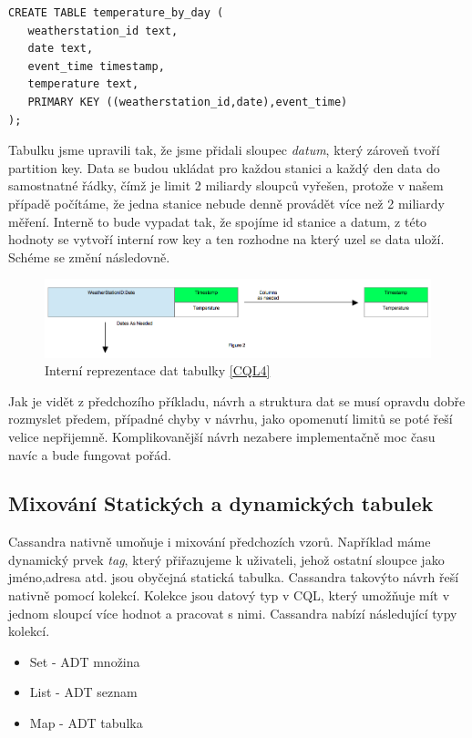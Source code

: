 \documentclass[thesis=M,czech]{FITthesis}[2012/06/26]
\begin{document}
\begin{lstlisting}[caption={Dynamická tabulka 2},label=CQL4]
CREATE TABLE temperature_by_day (
   weatherstation_id text,
   date text,
   event_time timestamp,
   temperature text,
   PRIMARY KEY ((weatherstation_id,date),event_time)
);
\end{lstlisting}

Tabulku jsme upravili tak, že jsme přidali sloupec \emph{datum}, který zároveň tvoří partition key. Data se budou ukládat pro každou stanici a každý den data do samostnatné řádky, čímž je limit 2 miliardy sloupců vyřešen, protože v našem případě počítáme, že jedna stanice nebude denně provádět více než 2 miliardy měření. Interně to bude vypadat tak, že spojíme id stanice a datum, z této hodnoty se vytvoří interní row key a ten rozhodne na který uzel se data uloží. Schéme se změní následovně. 

\begin{figure}[h]
\centering
\includegraphics[scale=0.4]{images/timeseries2}
\caption{Interní reprezentace dat tabulky \ref{CQL4}}
\label{fig:timeseries1}
\end{figure}

Jak je vidět z předchozího příkladu, návrh a struktura dat se musí opravdu dobře rozmyslet předem, případné chyby v návrhu, jako opomenutí limitů se poté řeší velice nepřijemně. Komplikovanější návrh nezabere implementačně moc času navíc a bude fungovat pořád.


\subsection{Mixování Statických a dynamických tabulek}
Cassandra nativně umoňuje i mixování předchozích vzorů. Například máme dynamický prvek \emph{tag}, který přiřazujeme k uživateli, jehož ostatní sloupce jako jméno,adresa atd. jsou obyčejná statická tabulka. Cassandra takovýto návrh řeší nativně pomocí kolekcí. Kolekce jsou datový typ v CQL, který umožňuje mít v jednom sloupcí více hodnot a pracovat s nimi. Cassandra nabízí následující typy kolekcí.

\begin{itemize}
\item Set - ADT množina
\item List - ADT seznam
\item Map - ADT tabulka
\end{itemize}
\end{document}
